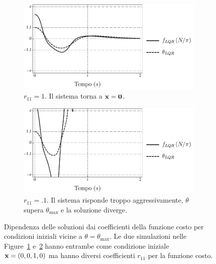 \begin{figure}
    \vskip 0pt
    \centering
    \begin{subfigure}[t]{0.48\textwidth}
        \centering
        \includegraphics[width=\textwidth]{assets/occasional-blowup-r1}
        \caption{$r_{11} = 1$. Il sistema torna a $\mathbf{x} = \mathbf{0}$.}
        \label{fig:does-not-blowup}
    \end{subfigure}
    \hfill
    \begin{subfigure}[t]{0.48\textwidth}
        \centering
        \includegraphics[width=\textwidth]{assets/occasional-blowup-r.1}
        \caption{$r_{11} = .1$. Il sistema risponde troppo
            aggressivamente, $\theta$ supera $\theta_{\max}$ e la soluzione diverge.}
        \label{fig:does-blowup}
    \end{subfigure}
    \caption[Dipendenza delle soluzioni dalla funzione costo]{
        Dipendenza delle soluzioni dai coefficienti della funzione costo
        per condizioni iniziali vicine a $\theta = \theta_{\max}$.
        Le due simulazioni nelle Figure~\ref{fig:does-not-blowup} e~\ref{fig:does-blowup}
        hanno entrambe come condizione iniziale $\mathbf{x} = (0, 0, 1, 0)$ ma
        hanno diversi coefficienti $r_{11}$ per la funzione costo.
    }
    \label{fig:occasional-blowup}
\end{figure}


